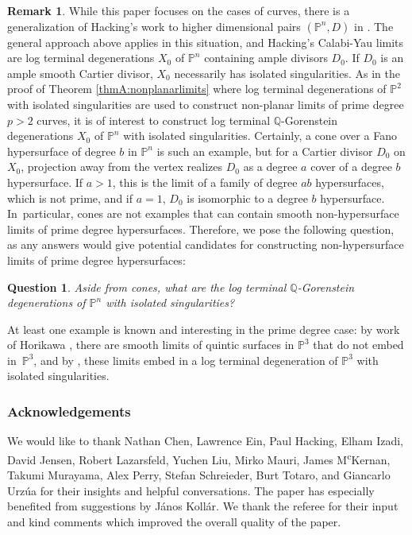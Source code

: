 \documentclass[JEP,XML,SOM,Unicode,NoFloatCountersInSection,published]{cedram}
\theoremstyle{plain}
\newtheorem*{question}{Question}
\theoremstyle{definition}
\newtheorem*{remark*}{Remark}
\newcommand\PP{{\mathbb{P}}}
\newcommand\QQ{{\mathbb Q}}
\begin{document}
\begin{remark*}
While this paper focuses on the cases of curves, there is a generalization of Hacking's work to higher dimensional pairs $(\PP^n, D)$ in \cite{DeV19}. The general approach above applies in this situation, and Hacking's Calabi-Yau limits are log terminal degenerations $X_0$ of $\PP^n$ containing ample divisors $D_0$. If $D_0$ is an ample smooth Cartier divisor, $X_0$ necessarily has isolated singularities. As in the proof of Theorem \ref{thmA:nonplanarlimits} where log terminal degenerations of $\PP^2$ with isolated singularities are used to construct non-planar limits of prime degree $p > 2$ curves, it is of interest to construct log terminal $\QQ$-Gorenstein degenerations $X_0$ of $\PP^n$ with isolated singularities. Certainly, a cone over a Fano hypersurface of degree $b$ in $\PP^n$ is such an example, but for a Cartier divisor $D_0$ on $X_0$, projection away from the vertex realizes $D_0$ as a degree $a$ cover of a degree $b$ hypersurface. If $a > 1$, this is the limit of a family of degree $ab$ hypersurfaces, which is not prime, and if $a = 1$, $D_0$ is isomorphic to a degree $b$ hypersurface. In~particular, cones are not examples that can contain smooth non-hypersurface limits of prime degree hypersurfaces. Therefore, we pose the following question, as any answers would give potential candidates for constructing non-hypersurface limits of prime degree hypersurfaces:

\begin{question}
Aside from cones, what are the log terminal $\QQ$-Gorenstein degenerations of $\PP^n$ with isolated singularities?
\end{question}

At least one example is known and interesting in the prime degree case: by work of Horikawa \cite{Horikawa}, there are smooth limits of quintic surfaces in $\PP^3$ that do not embed in~$\PP^3$, and by \cite[Ex.\,5.2]{DeV19}, these limits embed in a log terminal degeneration of $\PP^3$ with isolated singularities.
\end{remark*}

\subsubsection*{Acknowledgements} We would like to thank Nathan Chen, Lawrence Ein, Paul Hacking, Elham Izadi, David Jensen, Robert Lazarsfeld, Yuchen Liu, Mirko Mauri, James M\textsuperscript{c}Kernan, Takumi Murayama, Alex Perry, Stefan Schreieder, Burt Totaro, and Giancarlo Urzúa for their insights and helpful conversations. The paper has especially benefited from suggestions by János Kollár. We thank the referee for their input and kind comments which improved the overall quality of the paper.
\end{document}

